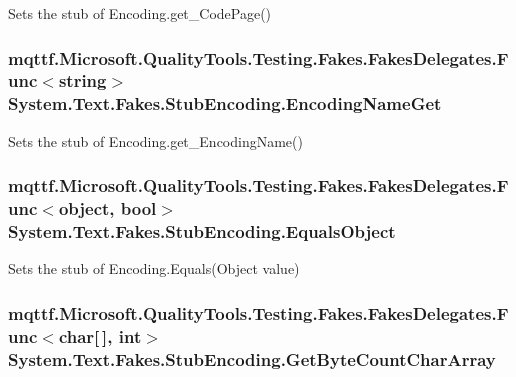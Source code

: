 Sets the stub of Encoding.\-get\-\_\-\-Code\-Page()

\hypertarget{class_system_1_1_text_1_1_fakes_1_1_stub_encoding_a4ae54fc0a8d57fb52a17dcc8e6cc53e0}{
\subsubsection[{Encoding\-Name\-Get}]{\setlength{\rightskip}{0pt plus 5cm}mqttf.\-Microsoft.\-Quality\-Tools.\-Testing.\-Fakes.\-Fakes\-Delegates.\-Func$<$string$>$ System.\-Text.\-Fakes.\-Stub\-Encoding.\-Encoding\-Name\-Get}}\label{class_system_1_1_text_1_1_fakes_1_1_stub_encoding_a4ae54fc0a8d57fb52a17dcc8e6cc53e0}


Sets the stub of Encoding.\-get\-\_\-\-Encoding\-Name()

\hypertarget{class_system_1_1_text_1_1_fakes_1_1_stub_encoding_a4f0cc8ea2a58a5a769b3e1c183d4d433}{
\subsubsection[{Equals\-Object}]{\setlength{\rightskip}{0pt plus 5cm}mqttf.\-Microsoft.\-Quality\-Tools.\-Testing.\-Fakes.\-Fakes\-Delegates.\-Func$<$object, bool$>$ System.\-Text.\-Fakes.\-Stub\-Encoding.\-Equals\-Object}}\label{class_system_1_1_text_1_1_fakes_1_1_stub_encoding_a4f0cc8ea2a58a5a769b3e1c183d4d433}


Sets the stub of Encoding.\-Equals(\-Object value)

\hypertarget{class_system_1_1_text_1_1_fakes_1_1_stub_encoding_abc929e5ecebd13cb5a246395b79ae770}{
\subsubsection[{Get\-Byte\-Count\-Char\-Array}]{\setlength{\rightskip}{0pt plus 5cm}mqttf.\-Microsoft.\-Quality\-Tools.\-Testing.\-Fakes.\-Fakes\-Delegates.\-Func$<$char\mbox{[}$\,$\mbox{]}, int$>$ System.\-Text.\-Fakes.\-Stub\-Encoding.\-Get\-Byte\-Count\-Char\-Array}}\label{class_system_1_1_text_1_1_fakes_1_1_stub_encoding_abc929e5ecebd13cb5a246395b79ae770}


